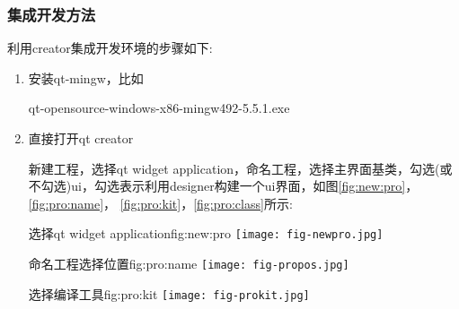 \documentclass[11pt,twoside]{article} %
\begin{document}
\subsubsection{集成开发方法}
利用creator集成开发环境的步骤如下:

\begin{enumerate}
\item 安装qt-mingw，比如

qt-opensource-windows-x86-mingw492-5.5.1.exe

\item 直接打开qt creator

新建工程，选择qt widget application，命名工程，选择主界面基类，勾选(或不勾选)ui，勾选表示利用designer构建一个ui界面，如图\ref{fig:new:pro}，\ref{fig:pro:name}，
\ref{fig:pro:kit}，\ref{fig:pro:class}所示:

\begin{insertfigure}{选择qt widget application}{fig:new:pro}{}%
  \centering
  \texttt{[image: fig-newpro.jpg]}
\end{insertfigure}

\begin{insertfigure}{命名工程选择位置}{fig:pro:name}{}%
  \centering
  \texttt{[image: fig-propos.jpg]}
\end{insertfigure}

\begin{insertfigure}{选择编译工具}{fig:pro:kit}{}%
  \centering
  \texttt{[image: fig-prokit.jpg]}
\end{insertfigure}


\end{enumerate}
\end{document}
